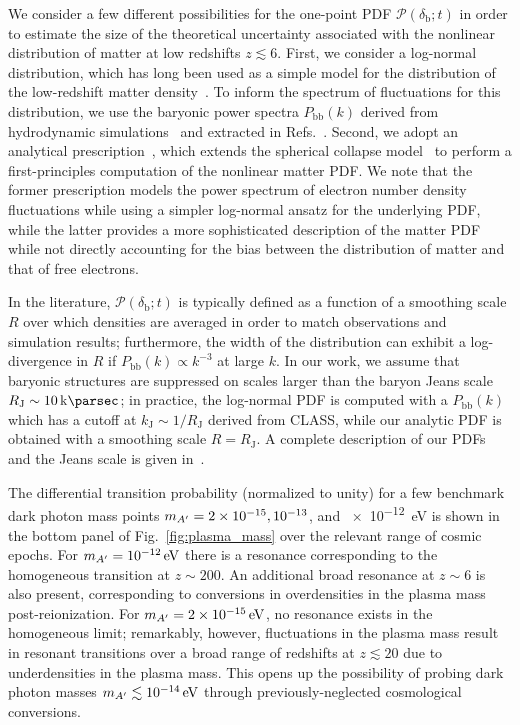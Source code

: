 \documentclass[prd,aps,10pt,nofootinbib,twocolumn,superscriptaddress,preprintnumbers,balancelastpage,longbibliography]{revtex4-1}
\begin{document}
We consider a few different possibilities for the one-point PDF $\mathcal{P}(\delta_\mathrm{b}; t)$ in order to estimate the size of the theoretical uncertainty associated with the nonlinear distribution of matter at low redshifts $z \lesssim 6$. First, we consider a log-normal distribution, which has long been used as a simple model for the distribution of the low-redshift matter density~\cite{1934ApJ....79....8H, Coles:1991if, Kayo:2001gu, Wild:2004me}. To inform the spectrum of fluctuations for this distribution, we use the baryonic power spectra $P_\mathrm{bb}(k)$ derived from hydrodynamic simulations~\cite{Nelson:2018uso,McAlpine:2015tma,McCarthy:2016mry,Genel:2014lma} and extracted in Refs.~\cite{Foreman:2019ahr,vanDaalen:2019pst}.
Second, we adopt an analytical prescription~\cite{Ivanov:2018lcg}, which extends the spherical collapse model~\cite{Valageas:2001zr, Valageas:2001td} to 
perform a first-principles computation of the nonlinear matter PDF\@. We note that the former prescription models the power spectrum of electron number density fluctuations while using a simpler log-normal ansatz for the underlying PDF, while the latter provides a more sophisticated description of the matter PDF while not directly accounting for the bias between the distribution of matter and that of free electrons. 

In the literature, $\mathcal{P}(\delta_\mathrm{b};t)$ is typically defined as a function of a smoothing scale $R$ over which densities are averaged in order to match observations and simulation results; furthermore, the width of the distribution can exhibit a log-divergence in $R$ if $P_\mathrm{bb}(k) \propto k^{-3}$ at large $k$. In our work, we assume that baryonic structures are suppressed on scales larger than the baryon Jeans scale $R_\mathrm{J} \sim \SI{10}{\kilo\parsec}$; in practice, the log-normal PDF is computed with a $P_\mathrm{bb}(k)$ which has a cutoff at $k_\mathrm{J} \sim 1/R_\mathrm{J}$ derived from CLASS, while our analytic PDF is obtained with a smoothing scale $R = R_\mathrm{J}$. A complete description of our PDFs and the Jeans scale is given in~.

The differential transition probability (normalized to unity) for a few benchmark dark photon mass points $m_{A^\prime}=\SI{2e-15}{}, \SI{e-13}{}$, and \SI{e-12}{\eV} is shown in the bottom panel of Fig.~\ref{fig:plasma_mass} over the relevant range of cosmic epochs. For $\mAp = \SI{e-12}{\eV}$ there is a resonance corresponding to the homogeneous transition at $z\sim 200$.  An additional broad resonance at $z\sim 6$ is also present, corresponding to conversions in overdensities in the plasma mass post-reionization. For $\mAp = \SI{2e-15}{\eV}$, no resonance exists in the homogeneous limit; remarkably, however, fluctuations in the plasma mass result in resonant transitions over a broad range of redshifts at $z\lesssim20$ due to underdensities in the plasma mass.
This opens up the possibility of probing dark photon masses $\mAp \lesssim \SI{e-14}{\eV}$ through previously-neglected cosmological conversions. 
\end{document}
